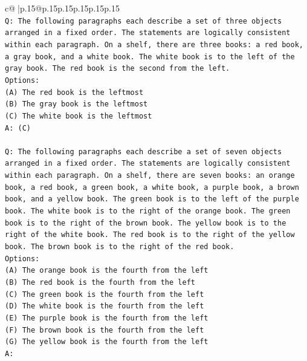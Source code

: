 \documentclass{article}
\begin{document}
{\begin{supertabular}{c@{$\;$}|p{.15\linewidth}@{}p{.15\linewidth}p{.15\linewidth}p{.15\linewidth}p{.15\linewidth}p{.15\linewidth}}
{{{\\ 
\texttt{Q: The following paragraphs each describe a set of three objects arranged in a fixed order. The statements are logically consistent within each paragraph. On a shelf, there are three books: a red book, a gray book, and a white book. The white book is to the left of the gray book. The red book is the second from the left.} \\
\texttt{Options:} \\
\texttt{(A) The red book is the leftmost} \\
\texttt{(B) The gray book is the leftmost} \\
\texttt{(C) The white book is the leftmost} \\
\texttt{A: (C)} \\
\\ 
\texttt{Q: The following paragraphs each describe a set of seven objects arranged in a fixed order. The statements are logically consistent within each paragraph. On a shelf, there are seven books: an orange book, a red book, a green book, a white book, a purple book, a brown book, and a yellow book. The green book is to the left of the purple book. The white book is to the right of the orange book. The green book is to the right of the brown book. The yellow book is to the right of the white book. The red book is to the right of the yellow book. The brown book is to the right of the red book.} \\
\texttt{Options:} \\
\texttt{(A) The orange book is the fourth from the left} \\
\texttt{(B) The red book is the fourth from the left} \\
\texttt{(C) The green book is the fourth from the left} \\
\texttt{(D) The white book is the fourth from the left} \\
\texttt{(E) The purple book is the fourth from the left} \\
\texttt{(F) The brown book is the fourth from the left} \\
\texttt{(G) The yellow book is the fourth from the left} \\
\texttt{A:} \\
            }
        }
    }
     \\ \\


\end{supertabular}}
\end{document}
